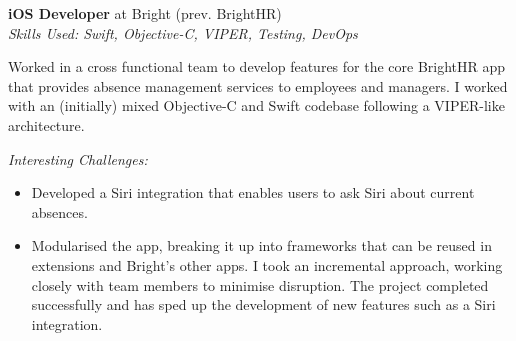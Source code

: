 \textbf{iOS Developer} at Bright (prev. BrightHR) \\
\textit{Skills Used: Swift, Objective-C, VIPER, Testing, DevOps}

Worked in a cross functional team to develop features for the core BrightHR app
that provides absence management services to employees and managers. I worked
with an (initially) mixed Objective-C and Swift codebase following a VIPER-like
architecture.

\medskip

\textit{Interesting Challenges:}

\smallskip

\begin{itemize}
\item Developed a Siri integration that enables users to ask Siri about current absences.

\item Modularised the app, breaking it up into frameworks that can be reused in
extensions and Bright's other apps. I took an incremental approach, working
closely with team members to minimise disruption. The project completed
successfully and has sped up the development of new features such as a Siri
integration.

\end{itemize}

